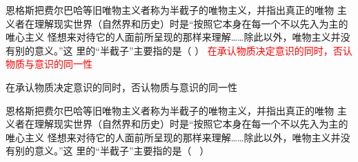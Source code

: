 
\question 
恩格斯把费尔巴哈等旧唯物主义者称为半截子的唯物主义，并指出真正的唯物 主义者在理解现实世界（自然界和历史）时是“按照它本身在每一个不以先入为主的唯心主义 怪想来对待它的人面前所呈现的那样来理解……除此以外，唯物主义并没有别的意义。”这 里的“半截子”主要指的是（  ）
   {
    \textcolor{red}{在承认物质决定意识的同时，否认物质与意识的同一性}
   }
   {
    \par

   }
    {在承认物质决定意识的同时，否认物质与意识的同一性}

\begin{solution}
    
    恩格斯把费尔巴哈等旧唯物主义者称为半截子的唯物主义，并指出真正的唯物
主义者在理解现实世界（自然界和历史）时是``按照它本身在每一个不以先入为主的唯心主义
怪想来对待它的人面前所呈现的那样来理解\ldots{}\ldots{}除此以外，唯物主义并没有别的意义。''这
里的``半截子''主要指的是（ ~）
\end{solution}



